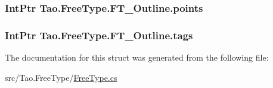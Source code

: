 \label{struct_tao_1_1_free_type_1_1_f_t___outline_a95c657604b4d1155ca826deccfa1dfe3}
\hypertarget{struct_tao_1_1_free_type_1_1_f_t___outline_ab8aa99c2bfbb8bd953f0fc2bf1b95bfb}{
\subsubsection[{points}]{\setlength{\rightskip}{0pt plus 5cm}IntPtr {\bf Tao.FreeType.FT\_\-Outline.points}}}
\label{struct_tao_1_1_free_type_1_1_f_t___outline_ab8aa99c2bfbb8bd953f0fc2bf1b95bfb}
\hypertarget{struct_tao_1_1_free_type_1_1_f_t___outline_a3fe92760de6d18fd55ab3e5730d4a374}{
\subsubsection[{tags}]{\setlength{\rightskip}{0pt plus 5cm}IntPtr {\bf Tao.FreeType.FT\_\-Outline.tags}}}
\label{struct_tao_1_1_free_type_1_1_f_t___outline_a3fe92760de6d18fd55ab3e5730d4a374}


The documentation for this struct was generated from the following file:\begin{DoxyCompactItemize}
\item 
src/Tao.FreeType/\hyperlink{_free_type_8cs}{FreeType.cs}\end{DoxyCompactItemize}
